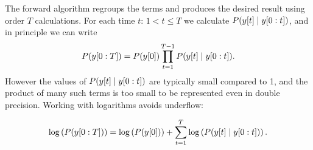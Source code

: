 The forward algorithm regroups the terms and produces the desired
result using order $T$ calculations.  For each time $t:\, 1 < t \leq
T$ we calculate $P({y}{[t]}\mid y[0:t])$, and in principle we can
write
\begin{equation*}
  P(y[0:T]) = P({y}{[0]}) \prod_{t=1}^{T-1} P({y}{[t]}\mid y[0:t]).
\end{equation*}
However the values of $P({y}{[t]}\mid y[0:t])$ are typically
small compared to 1, and the product of many such terms is too small
to be represented even in double precision.  Working with logarithms
avoids underflow:

\begin{equation}
  \mlabel{eq:logP}
  \log\left( P(\ts{y}{0}{T}) \right) = \log\left( P(\ti{y}{0})
 \right) + \sum_{t=1}^T \log\left( P(\ti{y}{t}\given \ts{y}{0}{t})\right).
\end{equation}

\newcommand{\alphax}[2]{%
  \colorbox{yellow}{%
    $P_{S(#1)\given \ts{Y}{0}{#1}}\left(#2 \given \ts{y}{0}{#1} \right)$%
  }%
}%
\newcommand{\prealpha}{%
  \colorbox{green}{%
    $P_{\ti{S}{t}\given \ts{Y}{0}{t}} \left(s \given  \ts{y}{0}{t} \right)$%
  }%
}%
\newcommand{\gammax}{%
  \colorbox{cyan}{%
    $P(\ti{y}{t}\given \ts{y}{0}{t})$%
  }%
}%
\newcommand{\pregamma}{%
  \colorbox{pink}{%
    $P_{\ti{S}{t},\ti{Y}{t}\given \ts{Y}{0}{t}} \left(s,\ti{y}{t}\given \ts{y}{0}{t}\right)$%
  }%
}%

